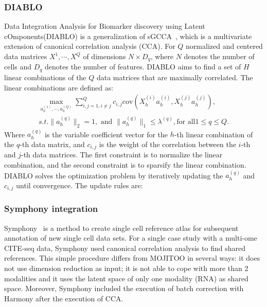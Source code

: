 \subsubsection{DIABLO}
Data Integration Analysis for Biomarker discovery using Latent cOmponents(DIABLO) is a generalization of sGCCA~\citep{tenenhaus2014variable}, which is a multivariate extension of canonical correlation analysis (CCA). For $Q$ normalized and centered data matrices $X^1, \cdots, X^Q$ of dimensions $N\times D_q$, where $N$ denotes the number of cells and $D_q$ denotes the number of features. DIABLO aims to find a set of $H$ linear combinations of the $Q$ data matrices that are maximally correlated. The linear combinations are defined as:
\begin{equation}
\begin{aligned}
	\underset{a_h^{(1)},\cdots,a_h^{(Q)}}{\max} \sum_{i,j=1, i\neq j}^Q c_{i,j} \text{cov}(X_h^{(i)} a_h^{(i)}, X_h^{(j)} a_h^{(j)}),\\
	s.t. \|a_h^{(q)}\|_2 = 1, \text{ and } \|a_h^{(q)}\|_1 \leq \lambda^{(q)}, \text{for all} 1\leq q \leq Q.
\end{aligned}
\end{equation}
Where $a_h^{(q)}$ is the variable coefficient vector for the $h$-th linear combination of the $q$-th data matrix, and $c_{i,j}$ is the weight of the correlation between the $i$-th and $j$-th data matrices. The first constraint is to normalize the linear combination, and the second constraint is to sparsify the linear combination. DIABLO solves the optimization problem by iteratively updating the $a_h^{(q)}$ and $c_{i,j}$ until convergence. The update rules are:

\subsubsection{Symphony integration}
Symphony~\cite{kang2021symphony} is a method to create single cell reference atlas for subsequent annotation of new single cell data sets. For a single case study with a multi-ome CITE-seq data, Symphony used canonical correlation analysis to find shared references. This simple procedure differs from MOJITOO in several ways: it does not use dimension reduction as input; it is not able to cope with more than 2 modalities and it uses the latent space of only one modality (RNA) as shared space.  Moreover, Symphony included the execution of batch correction with Harmony after the execution of CCA.

\label{background:sec2:TI}
